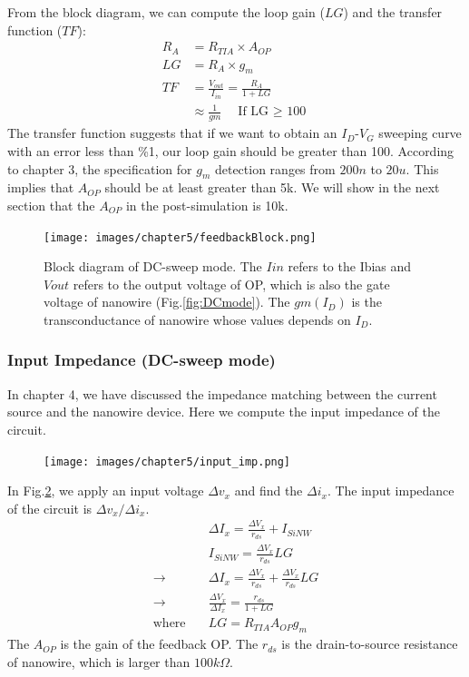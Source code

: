 {From the block diagram, we can compute the loop gain ($LG$) and the transfer function ($TF$):
\begin{align}
    R_A &= R_{TIA} \times A_{OP} \label{eq:TF_RA}\\
    LG &=  R_A \times g_m \label{eq:TF_LG}\\
    TF &= \frac{V_{out}}{I_{in}} =  \frac{R_A}{1 + LG} \label{eq:TF}\\
    &\approx \frac{1}{gm} \quad \text{If LG $\geq$ 100} \label{eq:TF_gm}
\end{align}
The transfer function suggests that if we want to obtain an $I_D$-$V_G$ sweeping curve with an error less than \%1, our loop gain should be greater than 100.
According to chapter 3, the specification for $g_m$ detection ranges from $200n$ to $20u$.
This implies that $A_{OP}$ should be at least greater than 5k.
We will show in the next section that the $A_{OP}$ in the post-simulation is 10k.
\begin{figure}[!htb]
    \centering
    \texttt{[image: images/chapter5/feedbackBlock.png]}
    \caption{Block diagram of DC-sweep mode. The $Iin$ refers to the Ibias and $Vout$ refers to the output voltage of OP, which is also the gate voltage of nanowire (Fig.\ref{fig:DCmode}). The $gm(I_D)$ is the transconductance of nanowire whose values depends on $I_D$.}
    \label{fig:feedblock}
\end{figure}

\subsubsection{Input Impedance (DC-sweep mode)}
In chapter 4, we have discussed the impedance matching between the current source and the nanowire device.
Here we compute the input impedance of the circuit.

\begin{figure}[!htbp]
    \centering
        \texttt{[image: images/chapter5/input\_imp.png]}
    \caption{}
    \label{fig:input_imp}
\end{figure}
In Fig.\ref{fig:input_imp}, we apply an input voltage $\Delta v_x$ and find the $\Delta i_x$.
The input impedance of the circuit is $\Delta v_x / \Delta i_x$.
\begin{align}
    & \Delta I_x = \frac{\Delta V_x}{r_{ds}} + I_{SiNW} \\
    & I_{SiNW} = \frac{\Delta V_x}{r_{ds}} LG \\
    \rightarrow \quad & \Delta I_x = \frac{\Delta V_x}{r_{ds}} + \frac{\Delta V_x}{r_{ds}} LG \\
    \rightarrow \quad & \frac{\Delta V_x}{\Delta I_x} = \frac{r_{ds}}{1 + LG} \label{eq:input_imp} \\
    \text{where}\quad & LG = R_{TIA}A_{OP} g_m
\end{align}
The $A_{OP}$ is the gain of the feedback OP.
The $r_{ds}$ is the drain-to-source resistance of nanowire, which is larger than $100k\Omega$.

}
